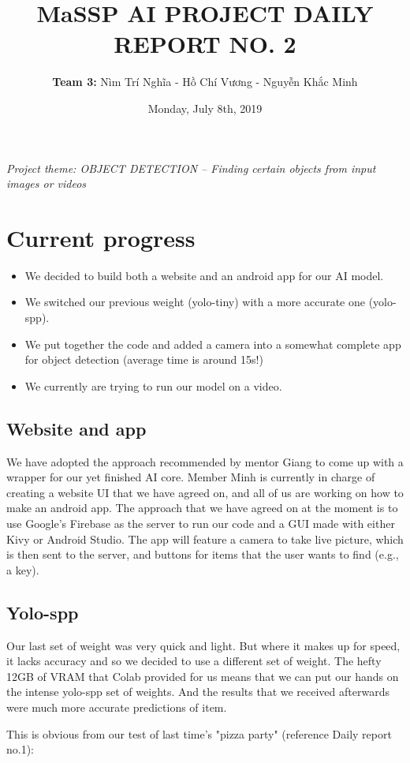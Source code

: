 \documentclass{article}
\title{\textbf{MaSSP AI PROJECT DAILY REPORT NO. 2}}
\author{\textbf{Team 3:}
Nìm Trí Nghĩa -
Hồ Chí Vương -
Nguyễn Khắc Minh}
\date{Monday, July 8th, 2019}
\begin{document}
\maketitle
\textit{Project theme: OBJECT DETECTION – Finding certain objects from input images or videos} 
\graphicspath{ {./images/} }

\section{Current progress}
\begin{itemize}
	\item We decided to build both a website and an android app for our AI model.
	\item We switched our previous weight (yolo-tiny) with a more accurate one (yolo-spp).
	\item We put together the code and added a camera into a somewhat complete app for object detection (average time is around 15s!)
	\item We currently are trying to run our model on a video.
\end{itemize}

\subsection{Website and app}
We have adopted the approach recommended by mentor Giang to come up with a wrapper for our yet finished AI core. Member Minh is currently in charge of creating a website UI that we have agreed on, and all of us are working on how to make an android app. The approach that we have agreed on at the moment is to use Google's Firebase as the server to run our code and a GUI made with either Kivy or Android Studio. The app will feature a camera to take live picture, which is then sent to the server, and buttons for items that the user wants to find (e.g., a key).

\subsection{Yolo-spp}
Our last set of weight was very quick and light. But where it makes up for speed, it lacks accuracy and so we decided to use a different set of weight. The hefty 12GB of VRAM that Colab provided for us means that we can put our hands on the intense yolo-spp set of weights. And the results that we received afterwards were much more accurate predictions of item.

This is obvious from our test of last time's "pizza party" (reference Daily report no.1):
\end{document}
